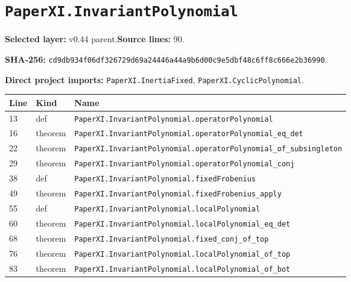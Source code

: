 \documentclass[10pt,oneside]{book}
\begin{document}
\section{\texorpdfstring{\nolinkurl{PaperXI.InvariantPolynomial}}{PaperXI.InvariantPolynomial}}\label{module:PaperXI.InvariantPolynomial}

\textbf{Selected layer:} v0.44 parent.\quad\textbf{Source lines:} 90.\par\textbf{SHA-256:} {\scriptsize\nolinkurl{cd9db934f06df326729d69a24446a44a9b6d00c9e5dbf48c6ff8c666e2b36990}}.


\textbf{Direct project imports:} \nolinkurl{PaperXI.InertiaFixed}, \nolinkurl{PaperXI.CyclicPolynomial}.

\begin{longtable}{@{}p{}p{}p{}@{}}\toprule Line&Kind&Name\\\midrule\endhead

13&def&\nolinkurl{PaperXI.InvariantPolynomial.operatorPolynomial}\\

16&theorem&\nolinkurl{PaperXI.InvariantPolynomial.operatorPolynomial_eq_det}\\

22&theorem&\nolinkurl{PaperXI.InvariantPolynomial.operatorPolynomial_of_subsingleton}\\

29&theorem&\nolinkurl{PaperXI.InvariantPolynomial.operatorPolynomial_conj}\\

38&def&\nolinkurl{PaperXI.InvariantPolynomial.fixedFrobenius}\\

49&theorem&\nolinkurl{PaperXI.InvariantPolynomial.fixedFrobenius_apply}\\

55&def&\nolinkurl{PaperXI.InvariantPolynomial.localPolynomial}\\

60&theorem&\nolinkurl{PaperXI.InvariantPolynomial.localPolynomial_eq_det}\\

68&theorem&\nolinkurl{PaperXI.InvariantPolynomial.fixed_conj_of_top}\\

76&theorem&\nolinkurl{PaperXI.InvariantPolynomial.localPolynomial_of_top}\\

83&theorem&\nolinkurl{PaperXI.InvariantPolynomial.localPolynomial_of_bot}\\

\bottomrule\end{longtable}
\end{document}
